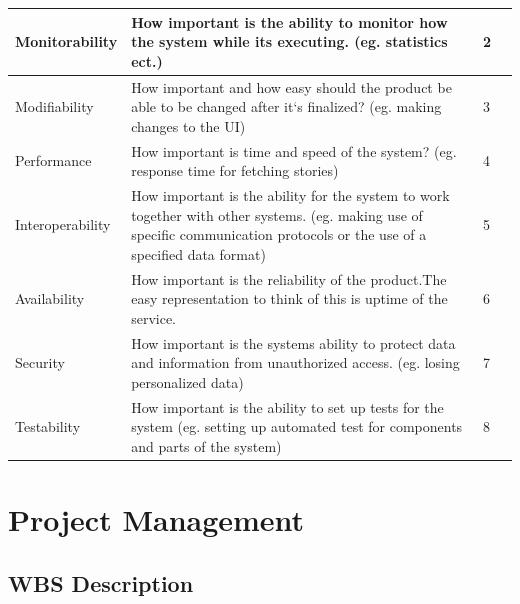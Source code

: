 \begin{appendices}
\begin{table}[!h]
\begin{tabular}{ | p{2.9cm} | p{9.5cm} | p{1.4cm} | p{2cm} | }
		Monitorability & How important is the ability to monitor how the system while its executing. (eg. statistics ect.) & 2 &  \\\hline		
		
		Modifiability & How important and how easy should the product be able to be changed after it`s finalized? (eg. making changes to the UI) & 3 &\\\hline
		
		Performance & How important is time and speed of the system? (eg. response time for fetching stories) & 4 &\\\hline
		
		Interoperability & How important is the ability for the system to work together with other systems. (eg. making use of specific communication protocols or the use of a specified data format) & 5 & 	\\\hline
		
		Availability & How important is the reliability of the product.The easy representation to think of this is uptime of the service. & 6 & \\\hline
	
		Security & How important is the systems ability to protect data and information from unauthorized access. (eg. losing personalized data) & 7 & \\\hline
		
		Testability & How important is the ability to set up tests for the system (eg. setting up automated test for components and parts of the system) & 8 &		\\\hline	
	\end{tabular}
\end{table}

\chapter{Project Management}
\label{app:project_managment} 

\section{WBS Description}
\label{app:wbs_description}



\end{appendices}
